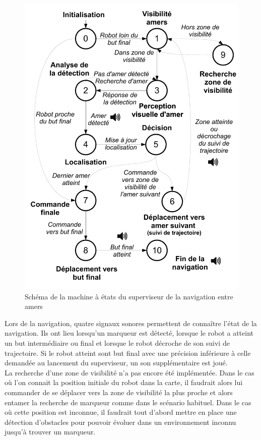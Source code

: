 \documentclass[10pt,a4paper]{article}
\begin{document}
\begin{figure}[!h]
\centering\includegraphics[scale=0.5]{figures/HLC_MEF.pdf}
\caption{Schéma de la machine à états du superviseur de la navigation entre amers}
\label{HLC_MEF}
\end{figure}

Lors de la navigation, quatre signaux sonores permettent de connaître l'état de la navigation. Ils ont lieu lorsqu'un marqueur est détecté, lorsque le robot a atteint un but intermédiaire ou final et lorsque le robot décroche de son suivi de trajectoire. Si le robot atteint sont but final avec une précision inférieure à celle demandée au lancement du superviseur, un son supplémentaire est joué.\\

La recherche d'une zone de visibilité n'a pas encore été implémentée. Dans le cas où l'on connait la position initiale du robot dans la carte, il faudrait alors lui commander de se déplacer vers la zone de visibilité la plus proche et alors entamer la recherche de marqueur comme dans le scénario habituel. Dans le cas où cette position est inconnue, il faudrait tout d'abord mettre en place une détection d'obstacles pour pouvoir évoluer dans un environnement inconnu jusqu'à trouver un marqueur.
\end{document}
